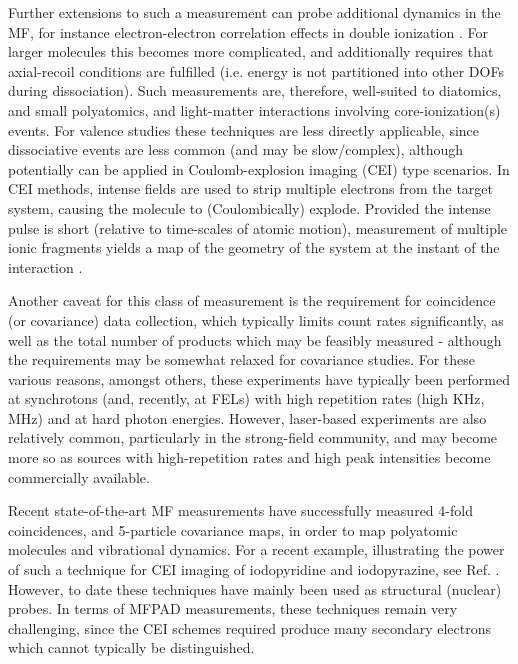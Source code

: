 Further extensions to such a measurement can probe additional dynamics in the MF, for instance electron-electron correlation effects in double ionization \cite{Akoury2007}. %
For larger molecules this becomes more complicated, and additionally requires that axial-recoil conditions are fulfilled (i.e. energy is not partitioned into other DOFs during dissociation). Such measurements are, therefore, well-suited to diatomics, and small polyatomics, and light-matter interactions involving core-ionization(s) events. For valence studies these techniques are less directly applicable, since dissociative events are less common (and may be slow/complex), although potentially can be applied in Coulomb-explosion imaging (CEI) type scenarios. In CEI methods, intense fields are used to strip multiple electrons from the target system, causing the molecule to (Coulombically) explode. Provided the intense pulse is short (relative to time-scales of atomic motion), measurement of multiple ionic fragments yields a map of the geometry of the system at the instant of the interaction \cite{stapelfeldt1998TimeresolvedCoulombExplosion,Underwood2015,Slater2015}. 

Another caveat for this class of measurement is the requirement for coincidence (or covariance) data collection, which typically limits count rates significantly, as well as the total number of products which may be feasibly measured - although the requirements may be somewhat relaxed for covariance studies. For these various reasons, amongst others, these experiments have typically been performed at synchrotons (and, recently, at FELs) with high repetition rates (high KHz, MHz) and at hard photon energies. However, laser-based experiments are also relatively common, particularly in the strong-field community, and may become more so as sources with high-repetition rates and high peak intensities become commercially available. 

Recent state-of-the-art MF measurements have successfully measured 4-fold coincidences, and 5-particle covariance maps, in order to map polyatomic molecules and vibrational dynamics. %
For a recent example, illustrating the power of such a technique for CEI imaging of iodopyridine and iodopyrazine, see Ref.   \cite{boll2022XrayMultiphotoninducedCoulomb}. However, to date these techniques have mainly been used as structural (nuclear) probes. In terms of MFPAD measurements, these techniques remain very challenging, since the CEI schemes required produce many secondary electrons which cannot typically be distinguished. 


